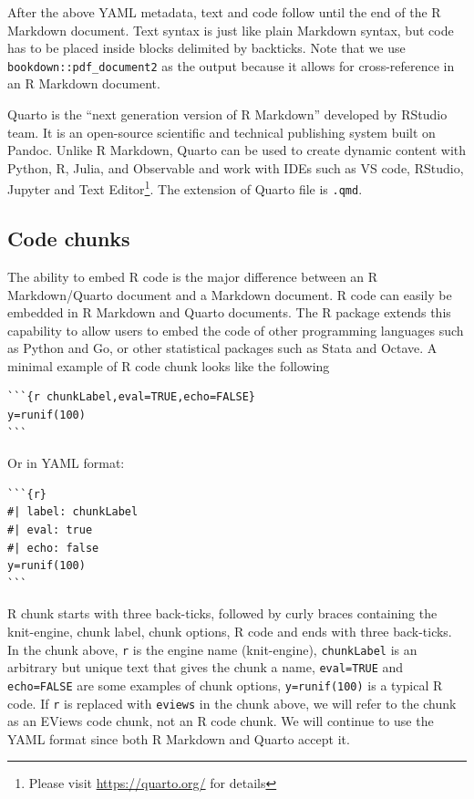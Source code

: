 After the above YAML metadata, text and code follow until the end of the R Markdown document. Text syntax is just like plain Markdown syntax, but code has to be placed inside blocks delimited by backticks. Note that we use \texttt{bookdown::pdf\_document2} as the output because it allows for cross-reference in an R Markdown document.

Quarto is the ``next generation version of R Markdown'' developed by RStudio team. It is an open-source scientific and technical publishing system built on Pandoc. Unlike R Markdown, Quarto can be used to create dynamic content with Python, R, Julia, and Observable and work with IDEs such as VS code, RStudio, Jupyter and Text Editor\footnote{Please visit \url{https://quarto.org/} for details}. The extension of Quarto file is \texttt{.qmd}.

\hypertarget{sec-chunks}{%
\subsection{Code chunks}\label{sec-chunks}}

The ability to embed R code is the major difference between an R Markdown/Quarto document and a Markdown document. R code can easily be embedded in R Markdown and Quarto documents. The R  package extends this capability to allow users to embed the code of other programming languages such as Python and Go, or other statistical packages such as Stata and Octave. A minimal example of R code chunk looks like the following

\begin{verbatim}
```{r chunkLabel,eval=TRUE,echo=FALSE} 
y=runif(100)
```
\end{verbatim}

Or in YAML format:

\begin{verbatim}
```{r} 
#| label: chunkLabel
#| eval: true
#| echo: false
y=runif(100)
```
\end{verbatim}

R chunk starts with three back-ticks, followed by curly braces containing the knit-engine, chunk label, chunk options, R code and ends with three back-ticks. In the chunk above, \texttt{r} is the engine name (knit-engine), \texttt{chunkLabel} is an arbitrary but unique text that gives the chunk a name, \texttt{eval=TRUE} and \texttt{echo=FALSE} are some examples of chunk options, \texttt{y=runif(100)} is a typical R code. If \texttt{r} is replaced with \texttt{eviews} in the chunk above, we will refer to the chunk as an EViews code chunk, not an R code chunk. We will continue to use the YAML format since both R Markdown and Quarto accept it.

